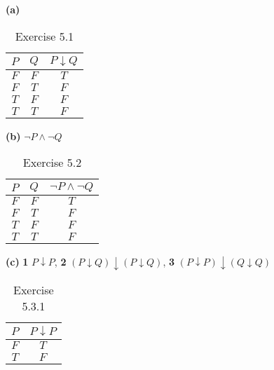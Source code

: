 
\newpage

\sol \textbf{(a)} 
  \begin{table}[h]
  \centering
  \label{tab:ex5-1 }
  \begin{tabular}{|c|c|c|}
    \hline
    $P$ & $Q$ & $P \downarrow Q$\\
    \hline 
    $F$ & $F$ & $T$\\  
    $F$ & $T$ & $F$\\
    $T$ & $F$ & $F$\\ 
    $T$ & $T$ & $F$\\
    \hline
  \end{tabular}
  \caption{Exercise 5.1}
\end{table}

\sol \textbf{(b)} $\neg P \land \neg Q$ 
  \begin{table}[h]
  \centering
  \label{tab:ex5-2 }
  \begin{tabular}{|c|c|c|}
    \hline
    $P$ & $Q$ & $\neg P \land \neg Q$\\
    \hline 
    $F$ & $F$ & $T$\\  
    $F$ & $T$ & $F$\\
    $T$ & $F$ & $F$\\ 
    $T$ & $T$ & $F$\\
    \hline
  \end{tabular}
  \caption{Exercise 5.2}
\end{table}

\sol \textbf{(c)} \textbf{1} $P \downarrow P$, \textbf{2} $(P \downarrow Q) \downarrow (P \downarrow Q)$, \textbf{3} $(P \downarrow P) \downarrow (Q \downarrow Q)$ 
  \begin{table}[h]
    \centering
    \label{tab:ex5-3-1 }
    \begin{tabular}{|c|c|}
      \hline
      $P$ & $P \downarrow P$\\
      \hline 
      $F$ & $T$\\  
      $T$ & $F$\\
      \hline
    \end{tabular}
    \caption{Exercise 5.3.1}
  \end{table}

